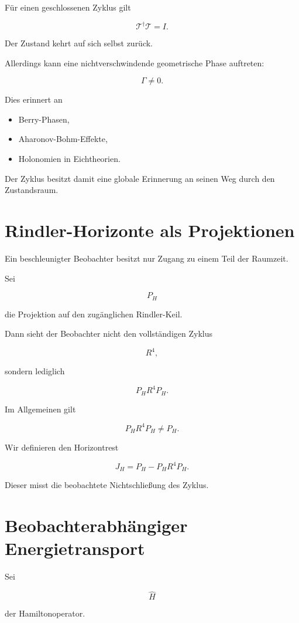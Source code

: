 \documentclass[11pt,a4paper]{article}
\begin{document}
	Für einen geschlossenen Zyklus gilt
	
	\[
	\mathcal T^\dagger \mathcal T=I.
	\]
	
	Der Zustand kehrt auf sich selbst zurück.
	
	Allerdings kann eine nichtverschwindende geometrische Phase auftreten:
	
	\[
	\Gamma \neq 0.
	\]
	
	Dies erinnert an
	
	\begin{itemize}
		\item Berry-Phasen,
		\item Aharonov-Bohm-Effekte,
		\item Holonomien in Eichtheorien.
	\end{itemize}
	
	Der Zyklus besitzt damit eine globale Erinnerung an seinen Weg durch den Zustandsraum.
	
	\section{Rindler-Horizonte als Projektionen}
	
	Ein beschleunigter Beobachter besitzt nur Zugang zu einem Teil der Raumzeit.
	
	Sei
	
	\[
	P_H
	\]
	
	die Projektion auf den zugänglichen Rindler-Keil.
	
	Dann sieht der Beobachter nicht den vollständigen Zyklus
	
	\[
	R^4,
	\]
	
	sondern lediglich
	
	\[
	P_H R^4 P_H.
	\]
	
	Im Allgemeinen gilt
	
	\[
	P_H R^4 P_H
	\neq
	P_H.
	\]
	
	Wir definieren den Horizontrest
	
	\[
	J_H
	=
	P_H
	-
	P_HR^4P_H.
	\]
	
	Dieser misst die beobachtete Nichtschließung des Zyklus.
	
	\section{Beobachterabhängiger Energietransport}
	
	Sei
	
	\[
	\hat H
	\]
	
	der Hamiltonoperator.
	
\end{document}
